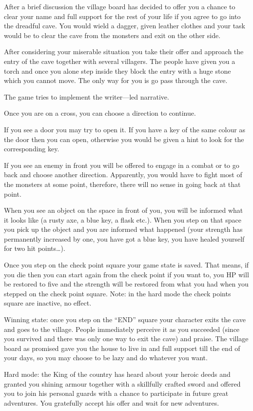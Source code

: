 \documentclass[landscape]{article}
\begin{document}
After a brief discussion the village board has decided to offer you a chance to
clear your name and full support for the rest of your life if you agree to go
into the dreadful cave. You would wield a dagger, given leather clothes and your
task would be to clear the cave from the monsters and exit on the other side.

After considering your miserable situation you take their offer and approach the
entry of the cave together with several villagers. The people have given you a
torch and once you alone step inside they block the entry with a huge stone
which you cannot move. The only way for you is go pass through the cave.

The game tries to implement the writer---led narrative.

Once you are on a cross, you can choose a direction to continue.

If you see a door you may try to open it. If you have a key of the same colour
as the door then you can open, otherwise you would be given a hint to look for
the corresponding key.

If you see an enemy in front you will be offered to engage in a combat or to go
back and choose another direction. Apparently, you would have to fight most of
the monsters at some point, therefore, there will no sense in going back at that
point.

When you see an object on the space in front of you, you will be informed what
it looks like (a rusty axe, a blue key, a flask etc.). When you step on that
space you pick up the object and you are informed what happened (your strength
has permanently increased by one, you have got a blue key, you have healed
yourself for two hit points\dots).

Once you step on the check point square your game state is saved. That means, if
you die then you can start again from the check point if you want to, you HP
will be restored to five and the strength will be restored from what you had
when you stepped on the check point square. Note: in the hard mode the check
points square are inactive, no effect.

Winning state: once you step on the ``END'' square your character exits the cave
and goes to the village. People immediately perceive it as you succeeded (since
you survived and there was only one way to exit the cave) and praise. The
village board as promised gave you the house to live in and full support till
the end of your days, so you may choose to be lazy and do whatever you want.

Hard mode: the King of the country has heard about your heroic deeds and
granted you shining armour together with a skillfully crafted sword and offered
you to join his personal guards with a chance to participate in future great
adventures. You gratefully accept his offer and wait for new adventures.
\end{document}
